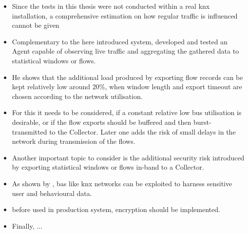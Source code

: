 \begin{itemize}
	\item Since the tests in this thesis were not conducted within a real \gls{knx} installation, a comprehensive estimation on how regular traffic is influenced cannot be given
	\item Complementary to the here introduced system, \textcite{Jung2018} developed and tested an Agent capable of observing live traffic and aggregating the gathered data to statistical windows or flows.
	\item He shows that the additional load produced by exporting flow records can be kept relatively low around 20\%, when window length and export timeout are chosen according to the network utilisation.
	\item For this it needs to be considered, if a constant relative low bus utilisation is desirable, or if the flow exports should be buffered and then burst-transmitted to the Collector. Later one adds the risk of small delays in the network during transmission of the flows.
	
	\item Another important topic to consider is the additional security risk introduced by exporting statistical windows or flows in-band to a Collector.
	\item As shown by \textcite{Mundt2012}, \gls{bas} like \gls{knx} networks can be exploited to harness sensitive user and behavioural data.
	\item before used in production system, encryption should be implemented.
	
	\item Finally, ...
	
	
\end{itemize}
